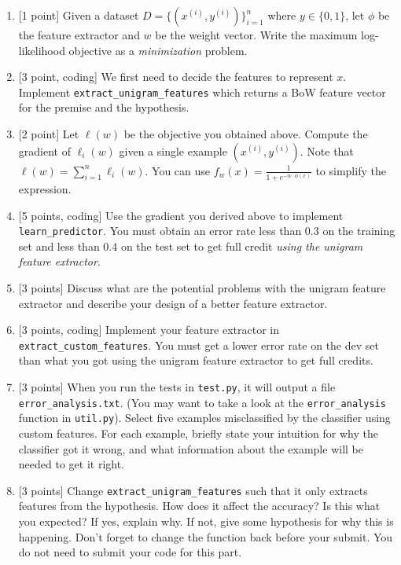 \documentclass{article}
\theoremstyle{case}
\theoremstyle{definition}
\newcommand{\hint}[1]{\noindent{[\textbf{HINT:} #1]}}
\begin{document}
\begin{enumerate}
    \item {[1 point]} Given a dataset $D=\{(x^{(i)}, y^{(i)})\}_{i=1}^n$ where $y\in\{0,1\}$, let $\phi$ be the feature extractor and $w$ be the weight vector. Write the maximum log-likelihood objective as a \textit{minimization} problem.
        \hint{Start with $\min_w - \sum_{i=1}^n \log p(y^{(i)}\mid x^{(i)}; w)$}

    \newpage
    \item {[3 point, coding]} We first need to decide the features to represent $x$.
        Implement \texttt{extract\_unigram\_features} which returns a BoW feature vector for the premise and the hypothesis.

    \newpage
    \item {[2 point]} Let $\ell(w)$ be the objective you obtained above.
    Compute the gradient of $\ell_i(w)$ given a single example $(x^{(i)}, y^{(i)})$.
        Note that $\ell(w) = \sum_{i=1}^n \ell_i(w)$.
        You can use $f_w(x) = \frac{1}{1 + e^{-w\cdot\phi(x)}}$
        to simplify the expression.

    \newpage
    \item {[5 points, coding]} Use the gradient you derived above to implement \texttt{learn\_predictor}.
        You must obtain an error rate less than 0.3 on the training set and less than 0.4 on the test set to get full credit \emph{using the unigram feature extractor}.

    \newpage
    \item {[3 points]} Discuss what are the potential problems with the unigram feature extractor
        and describe your design of a better feature extractor. 

    \newpage
    \item {[3 points, coding]}
        Implement your feature extractor in \texttt{extract\_custom\_features}.
        You must get a lower error rate on the dev set than what you got using the unigram feature extractor to get full credits.

    \newpage
\item {[3 points]} When you run the tests in \texttt{test.py}, it will output a file \texttt{error\_analysis.txt}. (You may want to take a look at the \texttt{error\_analysis} function in \texttt{util.py}).
    Select five examples misclassified by the classifier using custom features.
        For each example, briefly state your intuition for why the classifier got it wrong, and what information about the example will be needed to get it right.

    \newpage
\item {[3 points]} Change \texttt{extract\_unigram\_features} such that it only extracts features from the hypothesis.
    How does it affect the accuracy? Is this what you expected? If yes, explain why. If not, give some hypothesis for why this is happening.
    Don't forget to change the function back before your submit. You do not need to submit your code for this part.

\end{enumerate}
\end{document}
